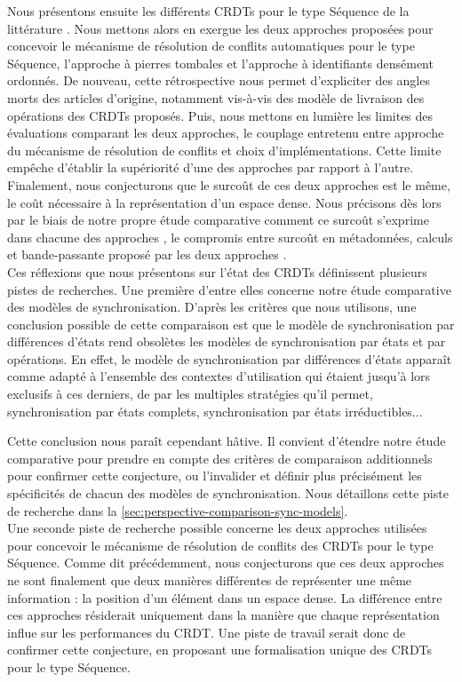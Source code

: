 Nous présentons ensuite les différents \acp{CRDT} pour le type Séquence de la littérature .
Nous mettons alors en exergue les deux approches proposées pour concevoir le mécanisme de résolution de conflits automatiques pour le type Séquence, \ie l'approche à pierres tombales et l'approche à identifiants densément ordonnés.
De nouveau, cette rétrospective nous permet d'expliciter des angles morts des articles d'origine, notamment vis-à-vis des modèle de livraison des opérations des \acp{CRDT} proposés.
Puis, nous mettons en lumière les limites des évaluations comparant les deux approches, \ie le couplage entretenu entre approche du mécanisme de résolution de conflits et choix d'implémentations.
Cette limite empêche d'établir la supériorité d'une des approches par rapport à l'autre.
Finalement, nous conjecturons que le surcoût de ces deux approches est le même, \ie le coût nécessaire à la représentation d'un espace dense.
Nous précisons dès lors par le biais de notre propre étude comparative comment ce surcoût s'exprime dans chacune des approches , \ie le compromis entre surcoût en métadonnées, calculs et bande-passante proposé par les deux approches .\\

Ces réflexions que nous présentons sur l'état des \acp{CRDT} définissent plusieurs pistes de recherches.
Une première d'entre elles concerne notre étude comparative des modèles de synchronisation.
D'après les critères que nous utilisons, une conclusion possible de cette comparaison est que le modèle de synchronisation par différences d'états rend obsolètes les modèles de synchronisation par états et par opérations.
En effet, le modèle de synchronisation par différences d'états apparaît comme adapté à l'ensemble des contextes d'utilisation qui étaient jusqu'à lors exclusifs à ces derniers, de par les multiples stratégies qu'il permet, \eg synchronisation par états complets, synchronisation par états irréductibles...

Cette conclusion nous paraît cependant hâtive.
Il convient d'étendre notre étude comparative pour prendre en compte des critères de comparaison additionnels pour confirmer cette conjecture, ou l'invalider et définir plus précisément les spécificités de chacun des modèles de synchronisation.
Nous détaillons cette piste de recherche dans la \autoref{sec:perspective-comparison-sync-models}.\\

Une seconde piste de recherche possible concerne les deux approches utilisées pour concevoir le mécanisme de résolution de conflits des \acp{CRDT} pour le type Séquence.
Comme dit précédemment, nous conjecturons que ces deux approches ne sont finalement que deux manières différentes de représenter une même information : la position d'un élément dans un espace dense.
La différence entre ces approches résiderait uniquement dans la manière que chaque représentation influe sur les performances du \ac{CRDT}.
Une piste de travail serait donc de confirmer cette conjecture, en proposant une formalisation unique des \acp{CRDT} pour le type Séquence.
